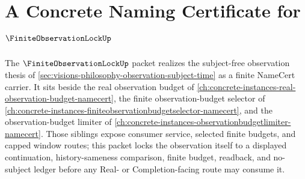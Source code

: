 \chapter{A Concrete Naming Certificate for $\FiniteObservationLockUp$}
\label{ch:concrete-instances-finiteobservationlock-namecert}

The $\FiniteObservationLockUp$ packet realizes the subject-free observation thesis of \autoref{sec:visions-philosophy-observation-subject-time} as a finite NameCert carrier. It sits beside the real observation budget of \autoref{ch:concrete-instances-real-observation-budget-namecert}, the finite observation-budget selector of \autoref{ch:concrete-instances-finiteobservationbudgetselector-namecert}, and the observation-budget limiter of \autoref{ch:concrete-instances-observationbudgetlimiter-namecert}. Those siblings expose consumer service, selected finite budgets, and capped window routes; this packet locks the observation itself to a displayed continuation, history-sameness comparison, finite budget, readback, and no-subject ledger before any Real- or Completion-facing route may consume it.


